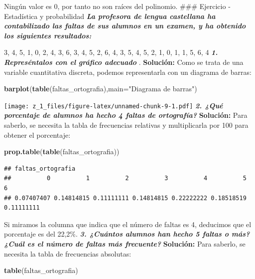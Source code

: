 \documentclass[12pt,]{krantz}
\newenvironment{Shaded}{\begin{snugshade}}{\end{snugshade}}
\newcommand{\DataTypeTok}[1]{\textcolor[rgb]{0.27,0.27,0.27}{#1}}
\newcommand{\KeywordTok}[1]{\textcolor[rgb]{0.27,0.27,0.27}{\textbf{#1}}}
\newcommand{\NormalTok}[1]{#1}
\newcommand{\StringTok}[1]{\textcolor[rgb]{0.5,0.5,0.5}{#1}}
\theoremstyle{definition}
\theoremstyle{definition}
\theoremstyle{definition}
\theoremstyle{remark}
\begin{document}
Ningún valor es 0, por tanto no son raíces del polinomio.
\#\#\# Ejercicio - Estadística y probabilidad
\textbf{\emph{La profesora de lengua castellana ha contabilizado las faltas de sus alumnos en un examen,
y ha obtenido los siguientes resultados:}}

3, 4, 5, 1, 0, 2, 4, 3, 6, 3, 4, 5, 2, 6, 4, 3, 5, 4, 5, 2, 1, 0, 1, 1, 5, 6, 4
\textbf{\emph{1. Represéntalos con el gráfico adecuado}} .
\textbf{Solución:}
Como se trata de una variable cuantitativa discreta, podemos representarla con un diagrama
de barras:

\begin{Shaded}
\begin{Highlighting}[]
\KeywordTok{barplot}\NormalTok{(}\KeywordTok{table}\NormalTok{(faltas_ortografia),}\DataTypeTok{main=}\StringTok{"Diagrama de barras"}\NormalTok{)}
\end{Highlighting}
\end{Shaded}

\texttt{[image: z\_1\_files/figure-latex/unnamed-chunk-9-1.pdf]}
\textbf{\emph{2. ¿Qué porcentaje de alumnos ha hecho 4 faltas de ortografía? }}
\textbf{Solución:}
Para saberlo, se necesita la tabla de frecuencias relativas y multiplicarla por 100 para obtener
el porcentaje:

\begin{Shaded}
\begin{Highlighting}[]
\KeywordTok{prop.table}\NormalTok{(}\KeywordTok{table}\NormalTok{(faltas_ortografia))}
\end{Highlighting}
\end{Shaded}

\begin{verbatim}
## faltas_ortografia
##          0          1          2          3          4          5          6 
## 0.07407407 0.14814815 0.11111111 0.14814815 0.22222222 0.18518519 0.11111111
\end{verbatim}

Si miramos la columna que indica que el número de faltas es 4, deducimos que el porcentaje es
del 22,2\%.
\textbf{\emph{3. ¿Cuántos alumnos han hecho 5 faltas o más?¿Cuál es el número de faltas más
frecuente?}}
\textbf{Solución:}
Para saberlo, se necesita la tabla de frecuencias absolutas:

\begin{Shaded}
\begin{Highlighting}[]
\KeywordTok{table}\NormalTok{(faltas_ortografia)}
\end{Highlighting}
\end{Shaded}
\end{document}
